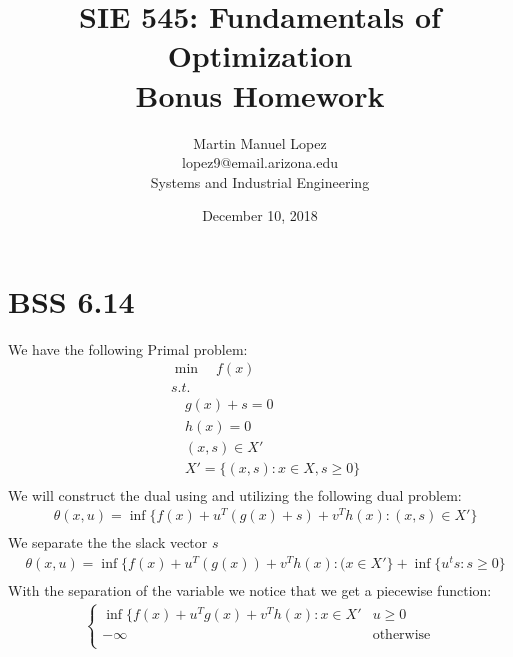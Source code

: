 \documentclass[12pt]{article}
\begin{document}
\title{SIE 545: Fundamentals of Optimization \\Bonus Homework}
\author{Martin Manuel Lopez \\lopez9@email.arizona.edu \\Systems and Industrial Engineering}
\date{December 10, 2018}
\maketitle
\section{BSS 6.14}
    We have the following Primal problem:\\
        \begin{align*}
            &\min \quad f(x)\\
            &s.t.\\
            &\quad g(x) + s = 0\\
            &\quad h(x) = 0\\
            &\quad (x,s) \in X'\\
            &\quad X' = \{(x,s): x \in X, s \geq 0\}\\
        \end{align*}
    We will construct the dual using and utilizing the following dual problem:\\
        \begin{align*}
            &\theta(x, u) = \inf\{f(x) + u^T (g(x) + s) + v^T h(x) : (x,s) \in X' \}\\ 
        \end{align*}
    We separate the the slack vector $s$\\ 
        \begin{align*}
            &\theta(x, u) =  \inf\{f(x) + u^T (g(x)) + v^T h(x) : (x \in X' \} + \inf \{u^ts : s \geq 0 \}\\
        \end{align*}
    With the separation of the variable we notice that we get a piecewise function: \\
        \begin{align*}
            \begin{cases} 
                    \inf \{f(x) + u^Tg(x) + v^T h(x) : x\in X' & u \geq 0\\
                    - \infty & \text{otherwise}\\
                \end{cases}\\
        \end{align*}
\end{document}
